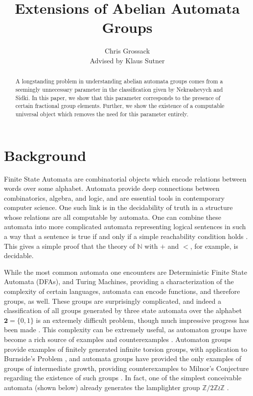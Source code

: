 \documentclass{article}
\title{Extensions of Abelian Automata Groups}
\author{Chris Grossack\\ Advised by Klaus Sutner}
\newcommand{\Z}{\mathbb{Z}}
\newcommand{\2}{\textbf{2}}
\theoremstyle{definition}
\begin{document}
\maketitle
\newpage

\begin{abstract}
  A longstanding problem in understanding abelian automata groups
  comes from a seemingly unnecessary parameter in the classification
  given by Nekrashevych and Sidki. In this paper, we show that
  this parameter corresponds to the presence of certain fractional group
  elements. Further, we show the existence of a computable universal object 
  which removes the need for this parameter entirely.
\end{abstract}
\newpage


\section{Background}
Finite State Automata are combinatorial objects which encode relations 
between words over some alphabet. Automata provide deep connections between
combinatorics, algebra, and logic, and are essential tools in contemporary 
computer science. One such link is in the decidability of truth in a structure
whose relations are all computable by automata. One can combine these automata 
into more complicated automata representing logical sentences in such a way 
that a sentence is true if and only if a simple reachability condition holds
\cite{Brny07:automatic_structures}. This gives a simple proof that the theory 
of $\mathbb{N}$ with $+$ and $<$, for example, is decidable.

While the most common automata one encounters are Deterministic Finite State
Automata (DFAs), and Turing Machines, providing a characterization of the 
complexity of certain languages, automata can encode functions, and therefore 
groups, as well. These groups are surprisingly complicated, and indeed a 
classification of all groups generated by three state automata over the 
alphabet $\2 = \{0,1\}$ is an extremely difficult problem, though much
impressive progress has been made \cite{Bondarenko09:three_state}. This
complexity can be extremely useful, as automaton groups have become a rich
source of examples and counterexamples
\cite{Nekrashevych05:self_similar_groups%
     ,Sidki00:one_rooted_trees%
     ,GrigorchukNS00:automata_groups%
     }. 
Automaton groups provide examples of
finitely generated infinite torsion groups, with application to 
Burnside's Problem \cite{Gupta83:burnside}, and automata groups have
provided the only examples of groups of intermediate growth, providing 
counterexamples to Milnor's Conjecture regarding the existence of such groups
\cite{Grigorchuk11:Milnor}. In fact, one of the simplest conceivable automata 
(shown below) already generates the lamplighter group $\Z/2\Z \wr \Z$
\cite{GrigorchukZuk01:lamplighter}.
\end{document}
